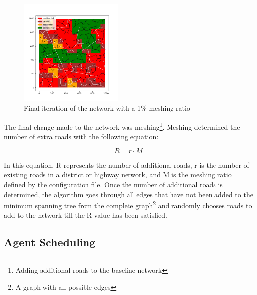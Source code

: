 \documentclass[11pt]{article}
\begin{document}
\begin{multicols}{2}
    \begin{figure}[H]
        \centering
        \includegraphics[width=0.45\textwidth]{images/meshednetwork.png}
        \caption{Final iteration of the network with a 1\% meshing ratio}
        \label{fig:final-meshed-network}
    \end{figure}

    \quad The final change made to the network was meshing\footnote{Adding additional roads to the baseline network}. Meshing determined the number of extra roads with the following equation:

    \[R = r \cdot M\]

    In this equation, R represents the number of additional roads, r is the number of existing roads in a district or highway network, and M is the meshing ratio defined by the configuration file. Once the number of additional roads is determined, the algorithm goes through all edges that have not been added to the minimum spanning tree from the complete graph\footnote{A graph with all possible edges} and randomly chooses roads to add to the network till the R value has been satisfied. 

    \subsection{Agent Scheduling}


\end{multicols}
\end{document}
